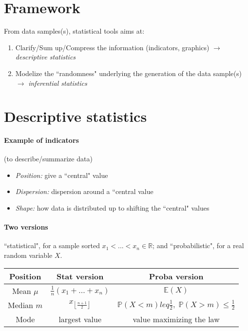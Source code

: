 \documentclass{article}
\begin{document}
\section{Framework}
From data samples(s), statistical tools aims at:
\begin{enumerate}
\item Clarify/Sum up/Compress the information (indicators, graphics) $\to$ \emph{descriptive statistics}
\item Modelize the ``randomness" underlying the generation of the data sample(s) $\to$ \emph{inferential statistics}
\end{enumerate}

\section{Descriptive statistics}
\paragraph{Example of indicators} (to describe/summarize data)
\begin{itemize}
\item \emph{Position:} give a ``central" value
\item \emph{Dispersion:} dispersion around a ``central value
\item \emph{Shape:} how data is distributed up to shifting the ``central" values
\end{itemize}

\paragraph{Two versions} ``statistical", for a sample sorted $x_1<...<x_n \in \mathbb{R}$; and ``probabilistic", for a real random variable $X$.

\begin{center}
\begin{tabular}{|c|c|c|}
\hline
Position & Stat version & Proba version\\
\hline
Mean $\mu$ & $\frac{1}{n}(x_1+...+x_n)$ & $\mathbb{E}(X)$\\
Median $m$ & $x_{\left\lfloor \frac{n+1}{2}\right\rfloor}$ & $\mathbb{P}(X<m)leq \frac{1}{2}, \; \mathbb{P}(X>m)\leq \frac{1}{2}$\\
Mode & largest value & value maximizing the law\\
\hline
\end{tabular}
\end{center}
\end{document}
